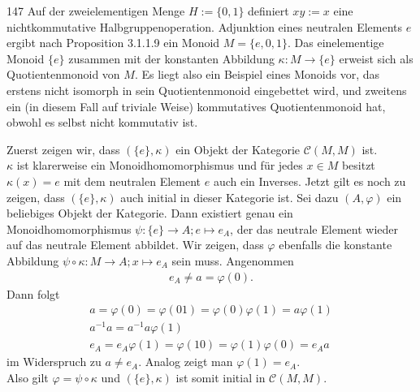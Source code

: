 \begin{algebraUE}{147}
Auf der zweielementigen Menge $H := \{0,1\}$ definiert $xy := x$ eine
nichtkommutative Halbgruppenoperation. Adjunktion eines neutralen Elements $e$
ergibt nach Proposition 3.1.1.9 ein Monoid $M = \{e,0,1\}$. Das einelementige
Monoid $\{e\}$ zusammen mit der konstanten Abbildung $\kappa: M \rightarrow \{e\}$
erweist sich als Quotientenmonoid von $M$. Es liegt also ein Beispiel eines
Monoids vor, das erstens nicht isomorph in sein Quotientenmonoid eingebettet
wird, und zweitens ein (in diesem Fall auf triviale Weise) kommutatives
Quotientenmonoid hat, obwohl es selbst nicht kommutativ ist.
\end{algebraUE}
\begin{solution}
Zuerst zeigen wir, dass $(\{e\}, \kappa)$ ein Objekt der Kategorie $\mathcal{C}(M,M)$ ist. \\
$\kappa$ ist klarerweise ein Monoidhomomorphismus und für jedes $x \in M$
besitzt $\kappa(x) = e$ mit dem neutralen Element $e$ auch ein Inverses.
Jetzt gilt es noch zu zeigen, dass $(\{e\}, \kappa)$ auch initial in dieser
Kategorie ist. Sei dazu $(A,\varphi)$ ein beliebiges Objekt der Kategorie.
Dann existiert genau ein Monoidhomomorphismus $\psi: \{e\} \rightarrow A; e \mapsto e_A$,
der das neutrale Element wieder auf das neutrale Element abbildet.
Wir zeigen, dass $\varphi$ ebenfalls die konstante Abbildung
$\psi \circ \kappa: M \rightarrow A; x \mapsto e_A$
sein muss.
Angenommen
\begin{align*}
  e_A \neq a = \varphi(0).
\end{align*}
Dann folgt
\begin{align*}
  a = \varphi(0) = \varphi(01) = \varphi(0)\varphi(1) = a\varphi(1) \\
  a^{-1}a = a^{-1}a\varphi(1) \\
  e_A = e_A\varphi(1) = \varphi(10) = \varphi(1)\varphi(0) = e_Aa
\end{align*}
im Widerspruch zu $a \neq e_A$. Analog zeigt man $\varphi(1) = e_A$. \\
Also gilt $\varphi = \psi \circ \kappa$ und $(\{e\}, \kappa)$ ist somit initial
in $\mathcal{C}(M,M)$.
\end{solution}
